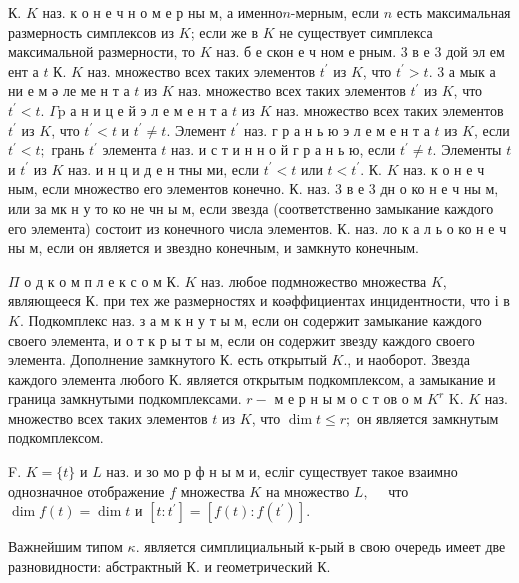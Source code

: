 \documentclass[10pt]{article}
\begin{document}
К. $K$ наз. к о н е ч н о м е р ны м, а именно$n$-мерным, если $n$ есть максимальная размерность симплексов из $K$; если же в $K$ не существует симплекса максимальной размерности, то $K$ наз. б е скон е ч ном е рным. 3 в е 3 дой эл ем ент а $t$ К. $K$ наз. множество всех таких элементов $t^{\prime}$ из $K$, что $t^{\prime}>t$. 3 а мык а ни е м ә ле ме н т а $t$ из $K$ наз. множество всех таких элементов $t^{\prime}$ из $K$, что $t^{\prime}<t$. $\Gamma \mathrm{p}$ а н и ц е й э л е м е н т а $t$ из $K$ наз. множество всех таких элементов $t^{\prime}$ из $K$, что $t^{\prime}<t$ и $t^{\prime} \neq t$. Элемент $t^{\prime}$ наз. г р а н ь ю э л е м е н т а $t$ из $K$, если $t^{\prime}<t ;$ грань $t^{\prime}$ элемента $t$ наз. и с т и н н о й $г$ р а н ь ю, если $t^{\prime} \neq t$. Элементы $t$ и $t^{\prime}$ из $K$ наз. и н ц и д е н тны ми, если $t^{\prime}<t$ или $t<t^{\prime}$. К. $K$ наз. к о н е ч ным, если множество его элементов конечно. К. наз. 3 в е 3 дн о ко н е ч ны м, или за мк н у то ко не чн ы м, если звезда (соответственно замыкание каждого его элемента) состоит из конечного числа элементов. К. наз. ло к а л ь о ко н е ч ны м, если он является и звездно конечным, и замкнуто конечным.



$\Pi$ о д к о м п л е к с о м К. $K$ наз. любое подмножество множества $K$, являющееся К. при тех же размерностях и коәффициентах инцидентности, что і в $K$. Подкомплекс наз. з а м к н у т ы м, если он содержит замыкание каждого своего элемента, и о т к р ы т ы м, если он содержит звезду каждого своего элемента. Дополнение замкнутого $К$. есть открытый $K .$, и наоборот. Звезда каждого элемента любого К. является открытым подкомплексом, а замыкание и граница замкнутыми подкомплексами. $r-$ м е р н ы м о с т ов о м $K^{r}$ K. $K$ наз. множество всех таких элементов $t$ из $K$, что $\operatorname{dim} t \leqslant r ;$ он является замкнутым подкомплексом.



F. $K=\{t\}$ и $L$ наз. и зо мо р ф н ы м и, есліг существует такое взаимно однозначное отображение $f$ множества $K$ на множество $L, \quad$ что $\operatorname{dim} f(t)=\operatorname{dim} t$ и $\left[t: t^{\prime}\right]=\left[f(t): f\left(t^{\prime}\right)\right]$.



Важнейшим типом $\kappa$. является симплициальный к-рый в свою очередь имеет две разновидности: абстрактный $К$. и геометрический $К$.
\end{document}
